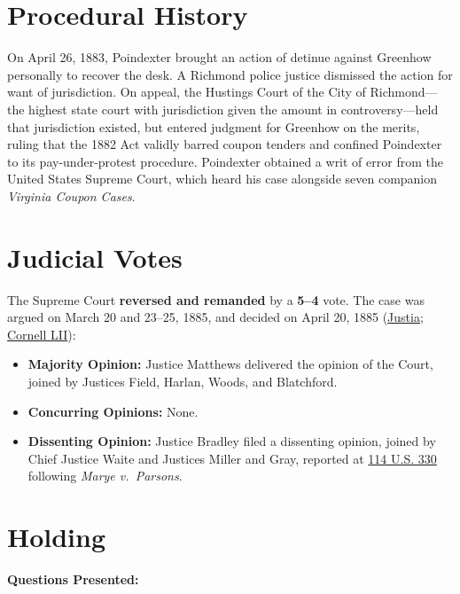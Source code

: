 \documentclass[12pt]{article}
\begin{document}
\section{Procedural History}
On April 26, 1883, Poindexter brought an action of detinue against Greenhow personally to recover the desk. A Richmond police justice dismissed the action for want of jurisdiction. On appeal, the Hustings Court of the City of Richmond---the highest state court with jurisdiction given the amount in controversy---held that jurisdiction existed, but entered judgment for Greenhow on the merits, ruling that the 1882 Act validly barred coupon tenders and confined Poindexter to its pay-under-protest procedure. Poindexter obtained a writ of error from the United States Supreme Court, which heard his case alongside seven companion \textit{Virginia Coupon Cases}.

\section{Judicial Votes}
The Supreme Court \textbf{reversed and remanded} by a \textbf{5--4} vote. The case was argued on March 20 and 23--25, 1885, and decided on April 20, 1885 (\href{https://supreme.justia.com/cases/federal/us/114/270/}{Justia}; \href{https://www.law.cornell.edu/supremecourt/text/114/270}{Cornell LII}):

\begin{itemize}
    \item \textbf{Majority Opinion:} Justice Matthews delivered the opinion of the Court, joined by Justices Field, Harlan, Woods, and Blatchford.
    \item \textbf{Concurring Opinions:} None.
    \item \textbf{Dissenting Opinion:} Justice Bradley filed a dissenting opinion, joined by Chief Justice Waite and Justices Miller and Gray, reported at \href{https://supreme.justia.com/cases/federal/us/114/325/}{114 U.S. 330} following \textit{Marye v.\ Parsons}.
\end{itemize}

\section{Holding}
\textbf{Questions Presented:}
\end{document}
